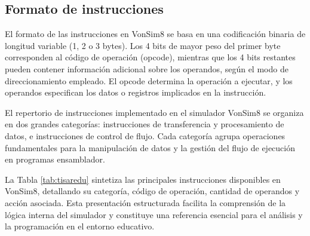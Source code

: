 \documentclass[12pt,oneside]{templates/unerthesis}
\begin{document}
\hypertarget{formato-de-instrucciones}{%
\subsection{Formato de instrucciones}\label{formato-de-instrucciones}}

El formato de las instrucciones en VonSim8 se basa en una codificación binaria de longitud variable (1, 2 o 3 bytes). Los 4 bits de mayor peso del primer byte corresponden al código de operación (opcode), mientras que los 4 bits restantes pueden contener información adicional sobre los operandos, según el modo de direccionamiento empleado. El opcode determina la operación a ejecutar, y los operandos especifican los datos o registros implicados en la instrucción.

El repertorio de instrucciones implementado en el simulador VonSim8 se organiza en dos grandes categorías: instrucciones de transferencia y procesamiento de datos, e instrucciones de control de flujo. Cada categoría agrupa operaciones fundamentales para la manipulación de datos y la gestión del flujo de ejecución en programas ensamblador.

La Tabla \ref{tab:tisaredu} sintetiza las principales instrucciones disponibles en VonSim8, detallando su categoría, código de operación, cantidad de operandos y acción asociada. Esta presentación estructurada facilita la comprensión de la lógica interna del simulador y constituye una referencia esencial para el análisis y la programación en el entorno educativo.
\end{document}
